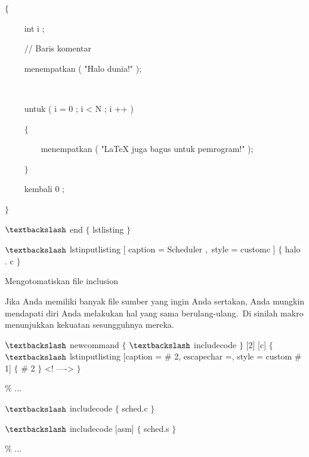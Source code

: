  $ \{ $\par

~~~~ int i ;\par

~~~~ // Baris komentar\par

~~~~ menempatkan ( "Halo dunia!" );\par

~~~ \par

~~~~ untuk ( i = 0 ; i < N ; i ++ )\par

~~~~ $ \{ $\par

~~~~~~~~ menempatkan ( "LaTeX juga bagus untuk pemrogram!" );\par

~~~~ $ \} $\par

~~~~ kembali 0 ;\par

 $ \} $\par

 $\textbackslash$ end $ \{ $ lstlisting $ \} $\par

 $\textbackslash$ lstinputlisting [ caption = Scheduler ,~style = customc ] $ \{ $ halo .  c $ \} $\par

Mengotomatiskan file inclusion \par

Jika Anda memiliki banyak file sumber yang ingin Anda sertakan, Anda mungkin mendapati diri Anda melakukan hal yang sama berulang-ulang. Di sinilah makro menunjukkan kekuatan sesungguhnya mereka.\par

 $\textbackslash$ newcommand $ \{ $ $\textbackslash$ includecode $ \} $ [2] [c] $ \{ $ $\textbackslash$ lstinputlisting [caption = $\#$ 2, escapechar =, style = custom $\#$ 1] $ \{ $ $\#$ 2 $ \} $ <! ----> $ \} $\par

 $\%$ ...\par

 $\textbackslash$ includecode $ \{ $ sched.c $ \} $\par

 $\textbackslash$ includecode [asm] $ \{ $ sched.s $ \} $\par

 $\%$ ...\par

